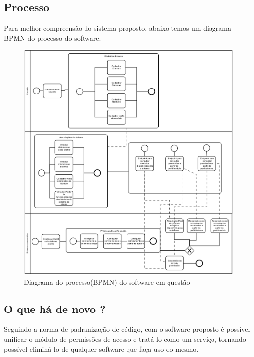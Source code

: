 \subsection{Processo}


Para melhor compreensão do sistema proposto, abaixo temos um diagrama BPMN do processo do software.


\begin{figure}
	\label{fig:diagramaBpmn}
	\includegraphics[width=1\textwidth]{img/diagrama_bpmn}
	\caption{Diagrama do processo(BPMN) do software em questão}
\end{figure}


\subsection{O que há de novo ?} %


Seguindo a norma de padranização de código, com o software proposto é possível unificar o módulo de permissões de acesso e tratá-lo como um serviço, tornando possível eliminá-lo de qualquer software que faça uso do mesmo.